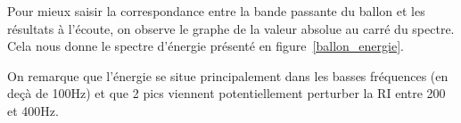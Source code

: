 Pour mieux saisir la correspondance entre la bande passante du ballon et les résultats à l'écoute, on observe le graphe
de la valeur absolue au carré du spectre. Cela nous donne le spectre d'énergie présenté en figure~\ref{ballon_energie}.

On remarque que l'énergie se situe principalement dans les basses fréquences (en deçà de 100Hz) et que 2 pics viennent
potentiellement perturber la RI entre 200 et 400Hz.

